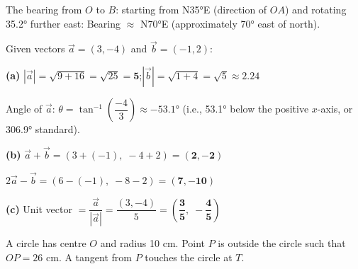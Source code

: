 \documentclass[addpoints]{exam}
\begin{document}
\begin{questions}
\begin{solution}[10cm]
The bearing from $O$ to $B$: starting from N\ang{35}E (direction of $OA$) and rotating \ang{35.2} further east:
Bearing $\approx$ N\ang{70}E (approximately \ang{70} east of north).
\end{solution}

\question[6] Given vectors $\vec{a} = (3, -4)$ and $\vec{b} = (-1, 2)$:
\begin{solution}[8cm]
\textbf{(a)} $|\vec{a}| = \sqrt{9+16} = \sqrt{25} = \mathbf{5}$;\quad $|\vec{b}| = \sqrt{1+4} = \sqrt{5} \approx \mathbf{2.24}$

Angle of $\vec{a}$: $\theta = \tan^{-1}\!\left(\dfrac{-4}{3}\right) \approx -\ang{53.1}$ (i.e., \ang{53.1} below the positive $x$-axis, or \ang{306.9} standard).

\textbf{(b)} $\vec{a} + \vec{b} = (3+(-1),\; -4+2) = \mathbf{(2, -2)}$

$2\vec{a} - \vec{b} = (6-(-1),\; -8-2) = \mathbf{(7, -10)}$

\textbf{(c)} Unit vector $= \dfrac{\vec{a}}{|\vec{a}|} = \dfrac{(3,-4)}{5} = \mathbf{\left(\dfrac{3}{5},\; -\dfrac{4}{5}\right)}$
\end{solution}

\question[6] A circle has centre $O$ and radius 10 cm. Point $P$ is outside the circle such that
$OP = 26$ cm. A tangent from $P$ touches the circle at $T$.
\end{questions}
\end{document}
